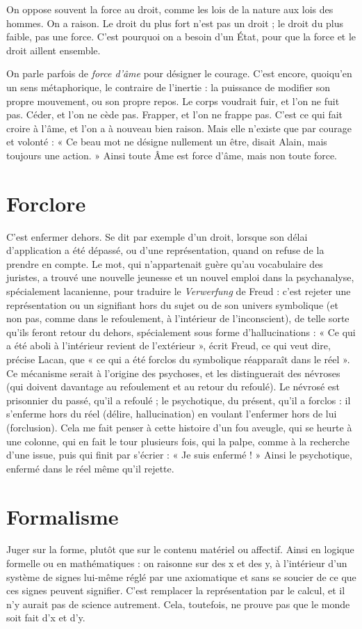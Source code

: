 On oppose souvent la force au droit, comme les lois de la nature aux lois
des hommes. On a raison. Le droit du plus fort n’est pas un droit ; le droit du
plus faible, pas une force. C’est pourquoi on a besoin d’un État, pour que la
force et le droit aillent ensemble.

On parle parfois de {\it force d'âme} pour désigner le courage. C’est encore,
quoiqu'en un sens métaphorique, le contraire de l’inertie : la puissance de
modifier son propre mouvement, ou son propre repos. Le corps voudrait fuir,
et l'on ne fuit pas. Céder, et l’on ne cède pas. Frapper, et l’on ne frappe pas.
C'est ce qui fait croire à l'âme, et l’on a à nouveau bien raison. Mais elle
n'existe que par courage et volonté : « Ce beau mot ne désigne nullement un
être, disait Alain, mais toujours une action. » Ainsi toute Âme est force d'âme,
mais non toute force.

\section{Forclore}
C’est enfermer dehors. Se dit par exemple d’un droit, lorsque
son délai d'application a été dépassé, ou d’une représentation,
quand on refuse de la prendre en compte. Le mot, qui n’appartenait guère qu’au
vocabulaire des juristes, a trouvé une nouvelle jeunesse et un nouvel emploi dans
la psychanalyse, spécialement lacanienne, pour traduire le {\it Verwerfung} de Freud :
c'est rejeter une représentation ou un signifiant hors du sujet ou de son univers
symbolique (et non pas, comme dans le refoulement, à l’intérieur de l’inconscient),
de telle sorte qu’ils feront retour du dehors, spécialement sous forme
d’hallucinations : « Ce qui a été aboli à l’intérieur revient de l'extérieur », écrit
Freud, ce qui veut dire, précise Lacan, que « ce qui a été forclos du symbolique
réapparaît dans le réel ». Ce mécanisme serait à l’origine des psychoses, et les distinguerait
des névroses (qui doivent davantage au refoulement et au retour du
refoulé). Le névrosé est prisonnier du passé, qu’il a refoulé ; le psychotique, du
présent, qu'il a forclos : il s’enferme hors du réel (délire, hallucination) en voulant
l’enfermer hors de lui (forclusion). Cela me fait penser à cette histoire d’un fou
aveugle, qui se heurte à une colonne, qui en fait le tour plusieurs fois, qui la
palpe, comme à la recherche d’une issue, puis qui finit par s’écrier : « Je suis
enfermé ! » Ainsi le psychotique, enfermé dans le réel même qu’il rejette.

\section{Formalisme}
Juger sur la forme, plutôt que sur le contenu matériel ou
affectif. Ainsi en logique formelle ou en mathématiques :
on raisonne sur des x et des y, à l’intérieur d’un système de signes lui-même
réglé par une axiomatique et sans se soucier de ce que ces signes peuvent signifier.
C’est remplacer la représentation par le calcul, et il n’y aurait pas de
science autrement. Cela, toutefois, ne prouve pas que le monde soit fait d’x et
d'y.

